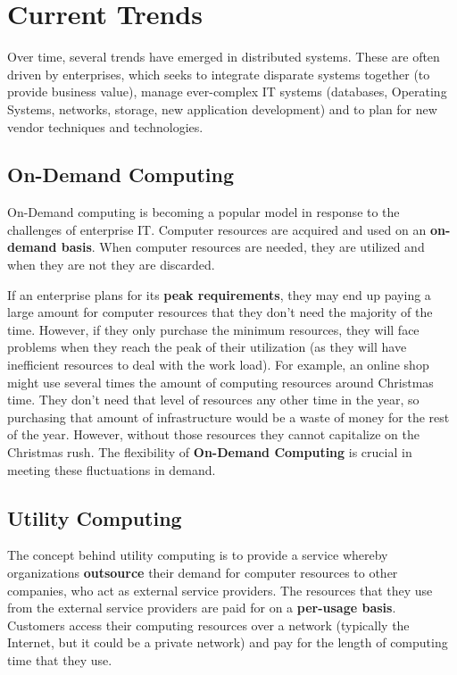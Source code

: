 \documentclass{article}
\begin{document}
\section{Current Trends}

Over time, several trends have emerged in distributed systems. These are often driven by enterprises, which seeks to integrate disparate systems together (to provide business value), manage ever-complex IT systems (databases, Operating Systems, networks, storage, new application development) and to plan for new vendor techniques and technologies.

\subsection{On-Demand Computing}

On-Demand computing is becoming a popular model in response to the challenges of enterprise IT. Computer resources are acquired and used on an \textbf{on-demand basis}. When computer resources are needed, they are utilized and when they are not they are discarded. 

If an enterprise plans for its \textbf{peak requirements}, they may end up paying a large amount for computer resources that they don't need the majority of the time. However, if they only purchase the minimum resources, they will face problems when they reach the peak of their utilization (as they will have inefficient resources to deal with the work load). For example, an online shop might use several times the amount of computing resources around Christmas time. They don't need that level of resources any other time in the year, so purchasing that amount of infrastructure would be a waste of money for the rest of the year. However, without those resources they cannot capitalize on the Christmas rush. The flexibility of \textbf{On-Demand Computing} is crucial in meeting these fluctuations in demand.

\subsection{Utility Computing}

The concept behind utility computing is to provide a service whereby organizations \textbf{outsource} their demand for computer resources to other companies, who act as external service providers. The resources that they use from the external service providers are paid for on a \textbf{per-usage basis}. Customers access their computing resources over a network (typically the Internet, but it could be a private network) and pay for the length of computing time that they use. 
\end{document}
